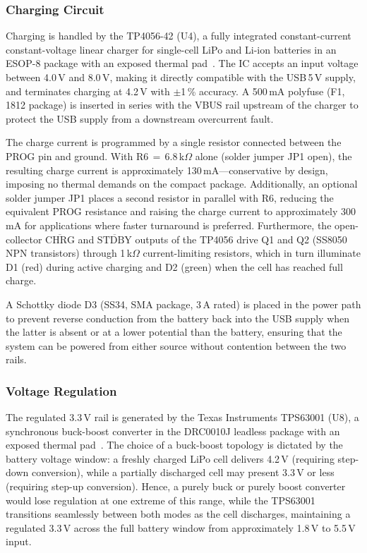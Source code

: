 \documentclass[english,bachelor]{tfgitic}[2026/01/22]
\begin{document}
\subsubsection{Charging Circuit}
\label{subsec:hw_charger}

Charging is handled by the TP4056-42 (U4), a fully integrated constant-current
constant-voltage linear charger for single-cell LiPo and Li-ion batteries in an
ESOP-8 package with an exposed thermal pad~\cite{nanjing2023tp4056}. The IC accepts
an input voltage between 4.0\,V and 8.0\,V, making it directly compatible with the
USB\,5\,V supply, and terminates charging at 4.2\,V with $\pm$1\,\% accuracy. A
500\,mA polyfuse (F1, 1812 package) is inserted in series with the VBUS rail upstream
of the charger to protect the USB supply from a downstream overcurrent fault.

The charge current is programmed by a single resistor connected between the PROG pin
and ground. With R6\,$=$\,6.8\,k$\Omega$ alone (solder jumper JP1 open), the
resulting charge current is approximately 130\,mA---conservative by design, imposing
no thermal demands on the compact package. Additionally, an optional solder jumper JP1 places a
second resistor in parallel with R6, reducing the equivalent PROG resistance and
raising the charge current to approximately 300\,mA for applications where faster
turnaround is preferred. Furthermore, the open-collector $\overline{\text{CHRG}}$ and
$\overline{\text{STDBY}}$ outputs of the TP4056 drive Q1 and Q2 (SS8050 NPN
transistors) through 1\,k$\Omega$ current-limiting resistors, which in turn
illuminate D1 (red) during active charging and D2 (green) when the cell has reached
full charge.

A Schottky diode D3 (SS34, SMA package, 3\,A rated) is placed in the power path to
prevent reverse conduction from the battery back into the USB supply when the latter
is absent or at a lower potential than the battery, ensuring that the system can
be powered from either source without contention between the two rails.

\subsubsection{Voltage Regulation}
\label{subsec:hw_regulator}

The regulated 3.3\,V rail is generated by the Texas Instruments TPS63001 (U8), a
synchronous buck-boost converter in the DRC0010J leadless package with an exposed
thermal pad~\cite{ti2012tps63001}. The choice of a buck-boost topology is dictated
by the battery voltage window: a freshly charged LiPo cell delivers 4.2\,V
(requiring step-down conversion), while a partially discharged cell may present
3.3\,V or less (requiring step-up conversion). Hence, a purely buck or purely boost
converter would lose regulation at one extreme of this range, while the TPS63001
transitions seamlessly between both modes as the cell discharges, maintaining a
regulated 3.3\,V across the full battery window from approximately 1.8\,V to 5.5\,V
input.
\end{document}
